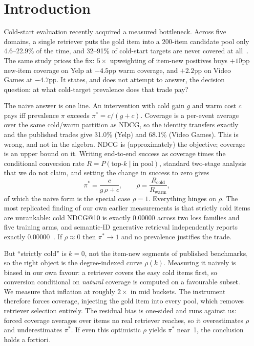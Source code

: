 \documentclass[sigconf,anonymous,review]{acmart}
\begin{document}
\maketitle

\section{Introduction}
Cold-start evaluation recently acquired a measured bottleneck. Across five domains, a single retriever puts the gold item into a 200-item candidate pool only 4.6--22.9\% of the time, and 32--91\% of cold-start targets are never covered at all~\cite{bottleneck}. The same study prices the fix: $5\times$ upweighting of item-new positives buys $+10$pp new-item coverage on Yelp at $-4.5$pp warm coverage, and $+2.2$pp on Video Games at $-4.7$pp. It states, and does not attempt to answer, the decision question: at what cold-target prevalence does that trade pay?

The naive answer is one line. An intervention with cold gain $g$ and warm cost $c$ pays iff prevalence $\pi$ exceeds $\pi^*=c/(g+c)$. Coverage is a per-event average over the same cold/warm partition as NDCG, so the identity transfers exactly and the published trades give 31.0\% (Yelp) and 68.1\% (Video Games). This is wrong, and not in the algebra. NDCG is (approximately) the objective; coverage is an upper bound on it. Writing end-to-end success as coverage times the conditional conversion rate $R=P(\text{top-}k\mid\text{in pool})$, standard two-stage analysis that we do not claim, and setting the change in success to zero gives
\begin{equation}
\pi^* = \frac{c}{g\,\rho + c},\qquad \rho=\frac{R_{\mathrm{cold}}}{R_{\mathrm{warm}}},
\label{eq:breakeven}
\end{equation}
of which the naive form is the special case $\rho=1$. Everything hinges on $\rho$. The most replicated finding of our own earlier measurements is that strictly cold items are unrankable: cold NDCG@10 is exactly 0.00000 across two loss families and five training arms, and semantic-ID generative retrieval independently reports exactly 0.00000~\cite{sidcold}. If $\rho\approx 0$ then $\pi^*\to 1$ and no prevalence justifies the trade.

But ``strictly cold'' is $k=0$, not the item-new segments of published benchmarks, so the right object is the degree-indexed curve $\rho(k)$. Measuring it naively is biased in our own favour: a retriever covers the easy cold items first, so conversion conditional on \emph{natural} coverage is computed on a favourable subset. We measure that inflation at roughly $2\times$ in mid buckets. The instrument therefore forces coverage, injecting the gold item into every pool, which removes retriever selection entirely. The residual bias is one-sided and runs against us: forced coverage averages over items no real retriever reaches, so it overestimates $\rho$ and underestimates $\pi^*$. If even this optimistic $\rho$ yields $\pi^*$ near~1, the conclusion holds a fortiori.
\end{document}
